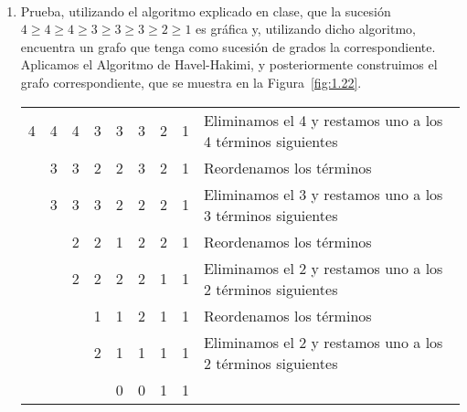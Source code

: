 \begin{ejercicio}\label{ej:1.22}~
    \begin{enumerate}
        \item Prueba, utilizando el algoritmo explicado en clase, que la sucesión $4 \geq 4 \geq 4 \geq 3 \geq 3 \geq 3 \geq 2 \geq 1$ es gráfica y, utilizando dicho algoritmo, encuentra un grafo que tenga como sucesión de grados la correspondiente.\\
        
        Aplicamos el Algoritmo de Havel-Hakimi, y posteriormente construimos el grafo correspondiente, que se muestra en la Figura~\ref{fig:1.22}.
        \begin{table}[H]
            \centering
            \begin{tabular}{cccccccc|l}
                4 & 4 & 4 & 3 & 3 & 3 & 2 & 1 & Eliminamos el 4 y restamos uno a los 4 términos siguientes\\
                  & 3 & 3 & 2 & 2 & 3 & 2 & 1 & Reordenamos los términos\\
                  & 3 & 3 & 3 & 2 & 2 & 2 & 1 & Eliminamos el 3 y restamos uno a los 3 términos siguientes\\
                  &   & 2 & 2 & 1 & 2 & 2 & 1 & Reordenamos los términos\\
                  &   & 2 & 2 & 2 & 2 & 1 & 1 & Eliminamos el 2 y restamos uno a los 2 términos siguientes\\
                  &   &   & 1 & 1 & 2 & 1 & 1 & Reordenamos los términos\\
                  &   &   & 2 & 1 & 1 & 1 & 1 & Eliminamos el 2 y restamos uno a los 2 términos siguientes\\
                  &   &   &   & 0 & 0 & 1 & 1 &
            \end{tabular}
        \end{table}

        \begin{figure}
            \centering
\end{figure}
\end{enumerate}
\end{ejercicio}
